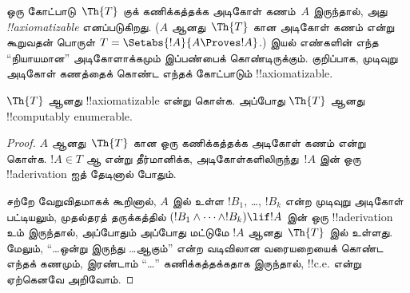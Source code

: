 \documentclass[../../../include/open-logic-section]{subfiles}
\begin{document}



ஒரு கோட்பாடு~$\Th{T}$ குக் கணிக்கத்தக்க அடிகோள் கணம்~$A$ இருந்தால்,
அது \emph{!!{axiomatizable}} எனப்படுகிறது. ($A$ ஆனது~$\Th{T}$ கான
அடிகோள் கணம் என்று கூறுவதன் பொருள்
$T = \Setabs{!A}{A \Proves !A}$.) இயல் எண்களின் எந்த “நியாயமான”
அடிகோளாக்கமும் இப்பண்பைக் கொண்டிருக்கும். குறிப்பாக, முடிவுறு அடிகோள்
கணத்தைக் கொண்ட எந்தக் கோட்பாடும் !!{axiomatizable}.

\begin{lem}
$\Th{T}$ ஆனது !!{axiomatizable} என்று கொள்க. அப்போது $\Th{T}$ ஆனது
!!{computably enumerable}.
\end{lem}

\begin{proof}
$A$ ஆனது~$\Th{T}$ கான ஒரு கணிக்கத்தக்க அடிகோள் கணம் என்று கொள்க.
$!A \in T$ ஆ என்று தீர்மானிக்க, அடிகோள்களிலிருந்து~$!A$ இன் ஒரு
!!a{derivation} ஐத் தேடினால் போதும்.

சற்றே வேறுவிதமாகக் கூறினால், $A$ இல் உள்ள
$!B_1$, \dots, $!B_k$ என்ற முடிவுறு அடிகோள் பட்டியலும்,
முதல்தரத் தருக்கத்தில் $(!B_1 \land \dots \land !B_k) \lif !A$ இன்
ஒரு !!a{derivation} உம் இருந்தால், அப்போதும் அப்போது மட்டுமே
$!A$ ஆனது~$\Th{T}$ இல் உள்ளது. மேலும், “\dots ஒன்று இருந்து \dots ஆகும்”
என்ற வடிவிலான வரையறையைக் கொண்ட எந்தக் கணமும், இரண்டாம் “\dots”
கணிக்கத்தக்கதாக இருந்தால், !!{c.e.} என்று ஏற்கெனவே அறிவோம்.
\end{proof}
\end{document}
